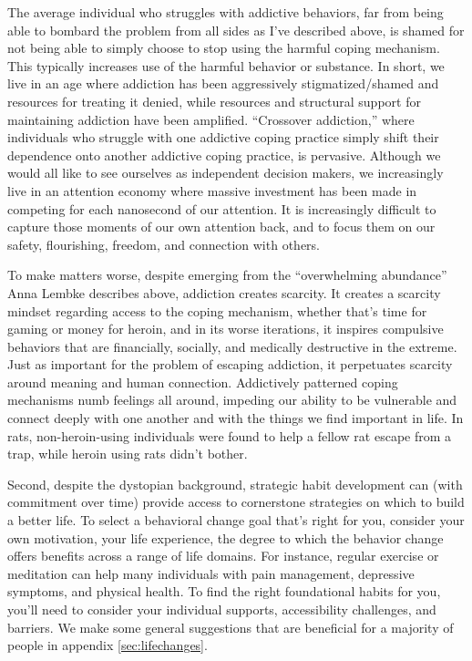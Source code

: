 \documentclass[12pt,letterpaper]{article}
\begin{document}
The average individual who struggles with addictive behaviors, far from being able to bombard the problem from all sides as I've described above, is shamed for not being able to simply choose to stop using the harmful coping mechanism. This typically increases use of the harmful behavior or substance. In short, we live in an age where addiction has been aggressively stigmatized/shamed and resources for treating it denied, while resources and structural support for maintaining addiction have been amplified. “Crossover addiction,” where individuals who struggle with one addictive coping practice simply shift their dependence onto another addictive coping practice, is pervasive. Although we would all like to see ourselves as independent decision makers, we increasingly live in an attention economy where massive investment has been made in competing for each nanosecond of our attention. It is increasingly difficult to capture those moments of our own attention back, and to focus them on our safety, flourishing, freedom, and connection with others.

To make matters worse, despite emerging from the “overwhelming abundance” Anna Lembke describes above, addiction creates scarcity. It creates a scarcity mindset regarding access to the coping mechanism, whether that's time for gaming or money for heroin, and in its worse iterations, it inspires compulsive behaviors that are financially, socially, and medically destructive in the extreme. Just as important for the problem of escaping addiction, it perpetuates scarcity around meaning and human connection. Addictively patterned coping mechanisms numb feelings all around, impeding our ability to be vulnerable and connect deeply with one another and with the things we find important in life. In rats, non-heroin-using individuals were found to help a fellow rat escape from a trap, while heroin using rats didn't bother.

Second, despite the dystopian background, strategic habit development can (with commitment over time) provide access to cornerstone strategies on which to build a better life. To select a behavioral change goal that's right for you, consider your own motivation, your life experience, the degree to which the behavior change offers benefits across a range of life domains.  For instance, regular exercise or meditation can help many individuals with pain management, depressive symptoms, and physical health. To find the right foundational habits for you, you'll need to consider your individual supports, accessibility challenges, and barriers. We make some general suggestions that are beneficial for a majority of people in appendix \ref{sec:lifechanges}.
\end{document}
